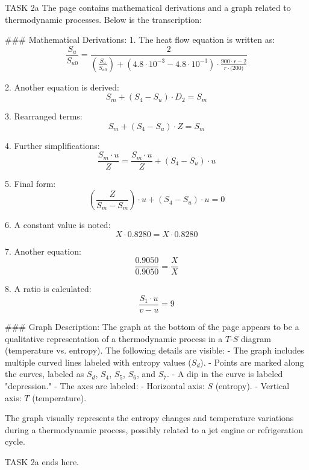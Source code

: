 TASK 2a  
The page contains mathematical derivations and a graph related to thermodynamic processes. Below is the transcription:

### Mathematical Derivations:
1. The heat flow equation is written as:
   \[
   \frac{S_u}{S_{u0}} = \frac{2}{\left(\frac{S_u}{S_{u0}}\right) + (4.8 \cdot 10^{-3} - 4.8 \cdot 10^{-3}) \cdot \frac{900 \cdot r - 2}{r \cdot \text{(200)}}}
   \]

2. Another equation is derived:
   \[
   S_m + (S_4 - S_u) \cdot D_2 = S_m
   \]

3. Rearranged terms:
   \[
   S_m + (S_4 - S_u) \cdot Z = S_m
   \]

4. Further simplifications:
   \[
   \frac{S_m \cdot u}{Z} = \frac{S_m \cdot u}{Z} + (S_4 - S_u) \cdot u
   \]

5. Final form:
   \[
   \left(\frac{Z}{S_m - S_m}\right) \cdot u + (S_4 - S_u) \cdot u = 0
   \]

6. A constant value is noted:
   \[
   X \cdot 0.8280 = X \cdot 0.8280
   \]

7. Another equation:
   \[
   \frac{0.9050}{0.9050} = \frac{X}{X}
   \]

8. A ratio is calculated:
   \[
   \frac{S_1 \cdot u}{v - u} = 9
   \]

### Graph Description:
The graph at the bottom of the page appears to be a qualitative representation of a thermodynamic process in a \( T \)-\( S \) diagram (temperature vs. entropy). The following details are visible:
- The graph includes multiple curved lines labeled with entropy values (\( S_d \)).
- Points are marked along the curves, labeled as \( S_d \), \( S_4 \), \( S_5 \), \( S_6 \), and \( S_7 \).
- A dip in the curve is labeled "depression."
- The axes are labeled:
  - Horizontal axis: \( S \) (entropy).
  - Vertical axis: \( T \) (temperature).

The graph visually represents the entropy changes and temperature variations during a thermodynamic process, possibly related to a jet engine or refrigeration cycle.

TASK 2a ends here.